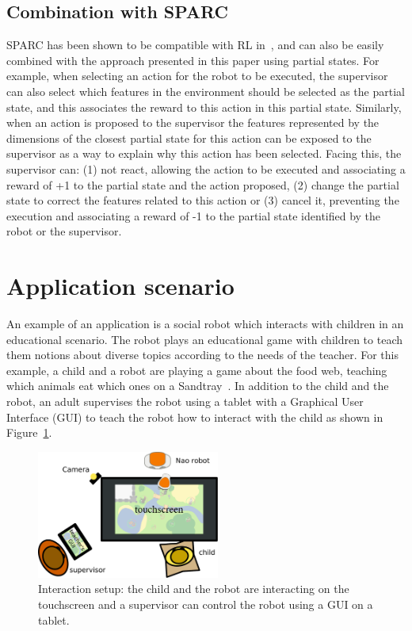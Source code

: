 \documentclass[letterpaper]{article} %
\begin{document}

\subsection{Combination with SPARC}

SPARC has been shown to be compatible with RL in~\cite{senft2017supervised}, and
can also be easily combined with the approach presented in this paper using
partial states. For example, when selecting an action for the robot to be
executed, the supervisor can also select which features in the environment
should be selected as the partial state, and this associates the reward to this
action in this partial state. Similarly, when an action is proposed to the
supervisor the features represented by the dimensions of the closest partial
state for this action can be exposed to the supervisor as a way to explain why
this action has been selected. Facing this, the supervisor can: (1) not react,
allowing the action to be executed and associating a reward of +1 to the partial
state and the action proposed, (2) change the partial state to correct the
features related to this action or (3) cancel it, preventing the execution and
associating a reward of -1 to the partial state identified by the robot or the
supervisor. 

\section{Application scenario}


An example of an application is a social robot which interacts with children in
an educational scenario.  The robot plays an educational game with children to
teach them notions about diverse topics according to the needs of the teacher.
For this example, a child and a robot are playing a game about the food web,
teaching which animals eat which ones on a Sandtray~\cite{baxter2012touchscreen}.
In addition to the child and the robot, an adult supervises the robot using a
tablet with a Graphical User Interface (GUI) to teach the robot how to interact
with the child as shown in Figure~\ref{fig:setup}.

\begin{figure}
        \centering
  \includegraphics[width=60mm]{./figs/setup} 
    \caption{Interaction setup: the child and the robot are interacting on the
    touchscreen and a supervisor can control the robot using a GUI on a tablet.}
        \label{fig:setup}
\end{figure}
\end{document}

